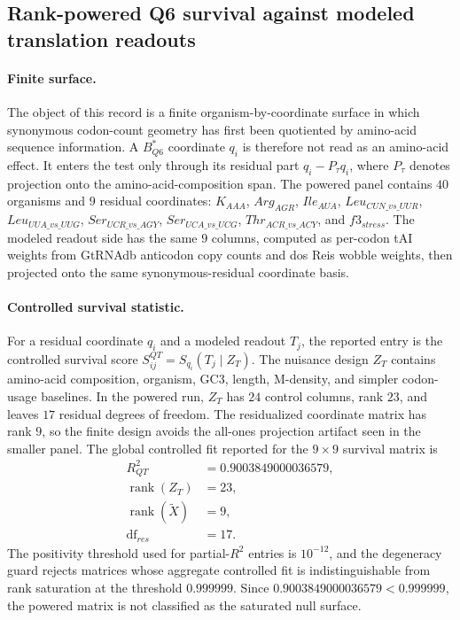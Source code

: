 \subsection{Rank-powered Q6 survival against modeled translation readouts}\label{sec:q6-rank-powered-translation-survival-cross-layer}

\paragraph{Finite surface.} The object of this record is a finite organism-by-coordinate surface in which synonymous codon-count geometry has first been quotiented by amino-acid sequence information. A $B^{\ast}_{Q6}$ coordinate $q_i$ is therefore not read as an amino-acid effect. It enters the test only through its residual part $q_i-P_{\tau}q_i$, where $P_{\tau}$ denotes projection onto the amino-acid-composition span. The powered panel contains $40$ organisms and $9$ residual coordinates: $K_{AAA}$, $Arg_{AGR}$, $Ile_{AUA}$, $Leu_{CUN\_vs\_UUR}$, $Leu_{UUA\_vs\_UUG}$, $Ser_{UCR\_vs\_AGY}$, $Ser_{UCA\_vs\_UCG}$, $Thr_{ACR\_vs\_ACY}$, and $f3_{stress}$. The modeled readout side has the same $9$ columns, computed as per-codon tAI weights from GtRNAdb anticodon copy counts and dos Reis wobble weights, then projected onto the same synonymous-residual coordinate basis.

\paragraph{Controlled survival statistic.} For a residual coordinate $q_i$ and a modeled readout $T_j$, the reported entry is the controlled survival score $S^{QT}_{ij}=S_{q_i}(T_j\mid Z_T)$. The nuisance design $Z_T$ contains amino-acid composition, organism, GC3, length, M-density, and simpler codon-usage baselines. In the powered run, $Z_T$ has $24$ control columns, rank $23$, and leaves $17$ residual degrees of freedom. The residualized coordinate matrix has rank $9$, so the finite design avoids the all-ones projection artifact seen in the smaller panel. The global controlled fit reported for the $9\times 9$ survival matrix is
$$
\begin{aligned}
R^2_{QT} &= 0.9003849000036579,\\
\operatorname{rank}(Z_T) &= 23,\\
\operatorname{rank}(\widetilde X) &= 9,\\
\operatorname{df}_{res} &= 17.
\end{aligned}
$$
The positivity threshold used for partial-$R^2$ entries is $10^{-12}$, and the degeneracy guard rejects matrices whose aggregate controlled fit is indistinguishable from rank saturation at the threshold $0.999999$. Since $0.9003849000036579<0.999999$, the powered matrix is not classified as the saturated null surface.


